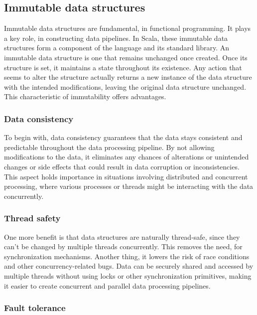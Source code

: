 \subsection{Immutable data structures}

Immutable data structures are fundamental, in functional programming. It plays a key role, in constructing data pipelines. In Scala, these immutable data structures form a component of the language and its standard library. An immutable data structure is one that remains unchanged once created. Once its structure is set, it maintains a state throughout its existence. Any action that seems to alter the structure actually returns a new instance of the data structure with the intended modifications, leaving the original data structure unchanged. This characteristic of immutability offers advantages.\footnotemark {}

\subsubsection{Data consistency}

To begin with, data consistency guarantees that the data stays consistent and predictable throughout the data processing pipeline. By not allowing modifications to the data, it eliminates any chances of alterations or unintended changes or side effects that could result in data corruption or inconsistencies. This aspect holds importance in situations involving distributed and concurrent processing, where various processes or threads might be interacting with the data concurrently.\footnotemark {}

\subsubsection{Thread safety}

One more benefit is that data structures are naturally thread-safe, since they can't be changed by multiple threads concurrently. This removes the need, for synchronization mechanisms. Another thing, it lowers the risk of race conditions and other concurrency-related bugs. Data can be securely shared and accessed by multiple threads without using locks or other synchronization primitives, making it easier to create concurrent and parallel data processing pipelines.\footnotemark[7]

\subsubsection{Fault tolerance}

